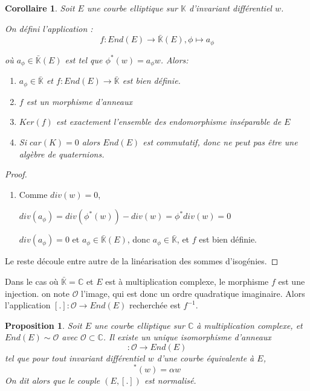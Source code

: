 \documentclass{article}
\newcommand{\C}[0]{\mathbb{C}}
\newcommand{\K}[0]{\mathbb{K}}
\newcommand{\Kb}[0]{\bar{\K}}
\newcommand{\OR}[0]{\mathcal{O}}
\newtheorem{Prop}[The]{Proposition}
\newtheorem{Coro}[The]{Corollaire}
\begin{document}
\begin{Coro}
	Soit $E$ une courbe elliptique sur $\K$ d'invariant différentiel $w$. 
	
	On défini l'application :
	\begin{equation*}
		f : End(E)\rightarrow\Kb(E) , \phi\longmapsto a_{\phi}
	\end{equation*}
	
	où $a_{\phi}\in\Kb(E)$ est tel que $\phi^{*}(w) = a_{\phi}w$. Alors:
	
	\begin{enumerate}
		\item $a_{\phi}\in\Kb$ et $f: End(E)\rightarrow\Kb$ est bien définie. 
		\item $f$ est un morphisme d'anneaux
		\item $Ker(f)$ est exactement l'ensemble des endomorphisme inséparable de $E$
		\item Si $car(K) = 0$ alors $End(E)$ est commutatif, donc ne peut pas être une algèbre de quaternions.
	\end{enumerate}
	
\end{Coro}

\begin{proof}
	\begin{enumerate}
		\item Comme $div(w) = 0$, 
		
		$div(a_{\phi}) = div\left( \phi^{*}(w)\right) - div(w) = \phi^{*}div(w) = 0$
		
		$div(a_{\phi}) = 0$ et $a_{\phi}\in\Kb(E)$, donc $a_{\phi}\in\Kb$, et $f$ est bien définie.
	\end{enumerate}
	Le reste découle entre autre de la linéarisation des sommes d'isogénies.
\end{proof}

Dans le cas où $\Kb = \C$ et $E$ est à multiplication complexe, le morphisme $f$ est une injection. on note $\OR$ l'image, qui est donc un ordre quadratique imaginaire. 
Alors l'application $[.] : \OR \rightarrow End(E)$ recherchée est $f^{-1}$. 

\begin{Prop}
	Soit $E$ une courbe elliptique sur $\C$ à multiplication complexe, et $End(E)\sim\OR$ avec $\OR\subset\C$. Il existe un unique isomorphisme d'anneaux
	\begin{equation*}
		[.] : \OR\rightarrow End(E)
	\end{equation*}
	tel que pour tout invariant différentiel $w$ d'une courbe équivalente à $E$,
	\begin{equation*}
		[\alpha]^{*}(w) = \alpha w
	\end{equation*}
	On dit alors que le couple $(E,[.])$ est normalisé.
\end{Prop}
\end{document}

